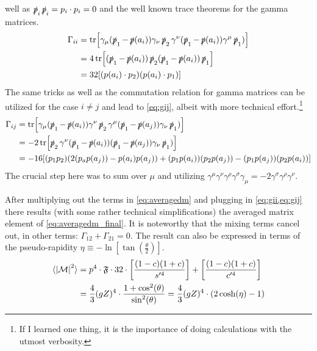 well as \(\operatorname{\slashed{p}}_i\operatorname{\slashed{p}}_i=p_i\cdot p_i = 0\) and the well known trace
theorems for the gamma matrices.
\begin{equation}
  \label{eq:gii}
  \begin{split}
\Gamma_{ii} &=
\tr[\gamma_\mu(\operatorname{\slashed{p}}_1-\operatorname{\slashed{p}}(a_i))\gamma_\nu\operatorname{\slashed{p}}_2\gamma^\nu(\operatorname{\slashed{p}}_1-\operatorname{\slashed{p}}(a_i))\gamma^\mu\operatorname{\slashed{p}}_1)]
\\
&= 4\tr[(\operatorname{\slashed{p}}_1-\operatorname{\slashed{p}}(a_i))\operatorname{\slashed{p}}_2(\operatorname{\slashed{p}}_1-\operatorname{\slashed{p}}(a_i))\operatorname{\slashed{p}}_1]\\
&= 32\qty[(p(a_i)\cdot p_2)(p(a_i)\cdot p_1)]
\end{split}
\end{equation}
%
The same tricks as well as the commutation relation for gamma matrices
can be utilized for the case \(i\neq j\) and lead to \cref{eq:gij},
albeit with more technical effort.\footnote{If I learned one thing, it
  is the importance of doing calculations with the utmost verbosity.}
%
\begin{equation}
  \label{eq:gij}
  \begin{split}
\Gamma_{ij} &=
\tr[\gamma_\mu(\operatorname{\slashed{p}}_1-\operatorname{\slashed{p}}(a_i))\gamma^\nu\operatorname{\slashed{p}}_2\gamma^\mu(\operatorname{\slashed{p}}_1-\operatorname{\slashed{p}}(a_j))\gamma_\nu\operatorname{\slashed{p}}_1)]\\
&= -2\tr[\operatorname{\slashed{p}}_2\gamma^\nu(\operatorname{\slashed{p}}_1-\operatorname{\slashed{p}}(a_i))(\operatorname{\slashed{p}}_1-\operatorname{\slashed{p}}(a_j))\gamma_\nu\operatorname{\slashed{p}}_1)]
   \\
&=-16\qty[(p_1p_2)(2(p_ap(a_j)) - p(a_i)p(a_j)) +
(p_1p(a_i))(p_2p(a_j)) - (p_1p(a_j))(p_2p(a_i))]
\end{split}
\end{equation}
%
The crucial step here was to sum over \(\mu\) and utilizing
\(\gamma ^{\mu }\gamma ^{\nu }\gamma ^{\rho }\gamma ^{\sigma }\gamma
_{\mu }=-2\gamma ^{\sigma }\gamma ^{\rho }\gamma ^{\nu }\).


After multiplying out the terms in \cref{eq:averagedm} and plugging in
\cref{eq:gii,eq:gij} there results (with some rather technical
simplifications) the averaged matrix element of
\cref{eq:averagedm_final}. It is noteworthy that the mixing terms
cancel out, in other terms: \(\Gamma_{12} + \Gamma_{21} = 0\). The
result can also be expressed in terms of the pseudo-rapidity
\(\eta \equiv -\ln[\tan(\frac{\theta}{2})]\).
%
\begin{equation}
  \label{eq:averagedm_final}
  \begin{split}
  \langle\abs{\mathcal{M}}^2\rangle &= p^4\cdot\mathfrak{F}\cdot
  32\cdot\qty[\frac{(1-c)(1+c)}{s'^4}] + \qty[\frac{(1-c)(1+c)}{c'^4}] \\
  &= \frac{4}{3}(gZ)^4 \cdot\frac{1+\cos^2(\theta)}{\sin^2(\theta)} =
  \frac{4}{3}(gZ)^4\cdot(2\cosh(\eta) - 1)
  \end{split}
\end{equation}
%
